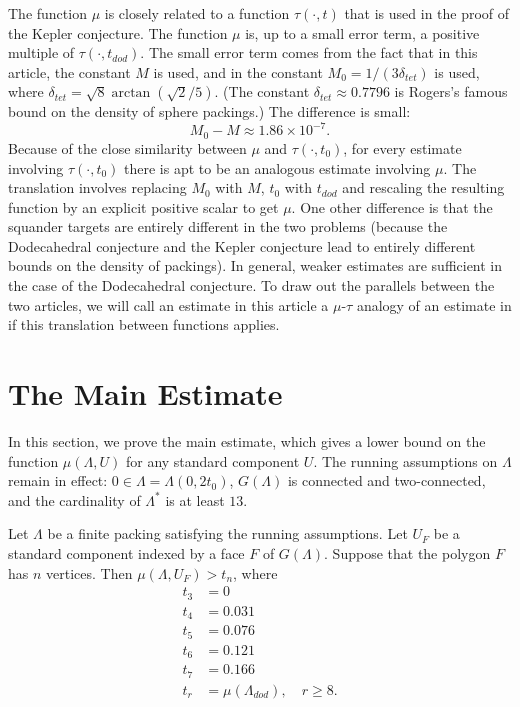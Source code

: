 \begin{remark}\label{rem:sq} The function $\mu$ is closely related to a function
$\tau(\cdot,t)$ that is used in the proof of the Kepler conjecture.  The
function $\mu$ is, up to a small error term, a positive multiple
of $\tau(\cdot,t_{dod})$.   The small
error term comes from the fact that in this article, the constant
$M$ is used, and in \cite{DCG} the constant
$M_0=1/(3 \delta_{tet})$ is used, where $\delta_{tet} = \sqrt8 \arctan(\sqrt2/5)$.  (The constant $\delta_{tet}\approx 0.7796$ is Rogers's famous bound on the density of sphere packings.)  The difference is small:
   $$M_0 - M \approx 1.86 \times 10^{-7}.$$
Because of the close similarity between $\mu$ and $\tau(\cdot,t_0)$,
for every estimate involving $\tau(\cdot,t_0)$ there is apt to
be an analogous estimate involving $\mu$.  The translation involves
replacing $M_0$ with $M$, $t_0$ with $t_{dod}$ and rescaling the
resulting function by an explicit positive scalar to get $\mu$.
One other difference is that the squander targets are entirely different
in the two problems (because the Dodecahedral conjecture and the
Kepler conjecture lead to entirely different bounds on the density
of packings).  In general, weaker estimates are sufficient in the
case of the Dodecahedral conjecture.
To draw out the parallels between the two articles, we will call
an estimate in this article a $\mu$-$\tau$ analogy of an estimate
in \cite{DCG} if this translation between functions applies.
\end{remark}



\section{The Main Estimate}

In this section, we prove the main estimate, which gives a lower
bound on the function $\mu(\Lambda,U)$ for any standard component $U$.
The running
assumptions on $\Lambda$ remain in effect: $0\in\Lambda= \Lambda(0,2t_0)$, $G(\Lambda)$ is connected and two-connected, and the cardinality
of $\Lambda^*$ is at least $13$.

\begin{theorem}\label{thm:main}  
Let $\Lambda$ be a finite packing satisfying the
running assumptions.  Let $U_F$ be a standard component indexed by
a face $F$ of $G(\Lambda)$.  Suppose that the polygon 
$F$ has $n$ vertices.  Then
   $\mu(\Lambda,U_F) > t_n$, where 
$$
\begin{array}{lll}
 t_3 &= 0\\
 t_4 &= 0.031\\
 t_5 &= 0.076\\
 t_6 &= 0.121\\
 t_7 &= 0.166\\
 t_r &= \mu(\Lambda_{dod}),\quad r\ge 8.
\end{array}
$$
\end{theorem}

